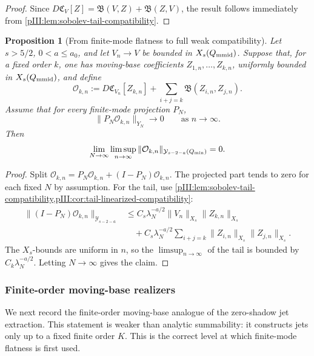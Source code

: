 \documentclass[11pt]{article}
\numberwithin{equation}{section}
\theoremstyle{plain}
\newtheorem{proposition}{Proposition}[section]
\theoremstyle{definition}
\theoremstyle{remark}
\newcommand{\calB}{\mathfrak B}
\newcommand{\calC}{\mathfrak C}
\newcommand{\calY}{\mathcal Y}
\begin{document}
\begin{proof}
Since \(D\calC_V[Z]=\calB(V,Z)+\calB(Z,V)\), the result follows immediately from
\cref{pIII:lem:sobolev-tail-compatibility}.
\end{proof}

\begin{proposition}[From finite-mode flatness to full weak compatibility]
\label{pIII:prop:finite-mode-flat-to-full-compatibility}
Let \(s>5/2\), \(0<a\le a_0\), and let \(V_n\to V\) be bounded in
\(X_s(Q_{\rm mmid})\).  Suppose that, for a fixed order \(k\), one has moving-base coefficients
\(Z_{1,n},\ldots,Z_{k,n}\), uniformly bounded in \(X_s(Q_{\rm mmid})\), and define
\[
        \mathcal O_{k,n}
        :=
        D\calC_{V_n}[Z_{k,n}]
        +
        \sum_{i+j=k}\calB(Z_{i,n},Z_{j,n}).
\]
Assume that for every finite-mode projection \(P_N\),
\[
        \|P_N\mathcal O_{k,n}\|_{Y_N}\to0
        \qquad\text{as }n\to\infty.
\]
Then
\[
        \lim_{N\to\infty}\limsup_{n\to\infty}
        \|\mathcal O_{k,n}\|_{\calY_{s-2-a}(Q_{\rm min})}=0.
\]
\end{proposition}

\begin{proof}
Split \(\mathcal O_{k,n}=P_N\mathcal O_{k,n}+(I-P_N)\mathcal O_{k,n}\).  The projected part tends
to zero for each fixed \(N\) by assumption.  For the tail, use
\cref{pIII:lem:sobolev-tail-compatibility,pIII:cor:tail-linearized-compatibility}:
\[
\begin{aligned}
        \|(I-P_N)\mathcal O_{k,n}\|_{\calY_{s-2-a}}
        &\le
        C_s\lambda_N^{-a/2}
        \|V_n\|_{X_s}\|Z_{k,n}\|_{X_s} \\
        &\quad+
        C_s\lambda_N^{-a/2}
        \sum_{i+j=k}\|Z_{i,n}\|_{X_s}\|Z_{j,n}\|_{X_s}.
\end{aligned}
\]
The \(X_s\)-bounds are uniform in \(n\), so the \(\limsup_{n\to\infty}\) of the tail is bounded by
\(C_k\lambda_N^{-a/2}\).  Letting \(N\to\infty\) gives the claim.
\end{proof}

\subsubsection{Finite-order moving-base realizers}
\label{pIII:subsec:finite-order-moving-base-realizers}

We next record the finite-order moving-base analogue of the zero-shadow jet extraction.  This
statement is weaker than analytic summability: it constructs jets only up to a fixed finite order
\(K\).  This is the correct level at which finite-mode flatness is first used.
\end{document}

